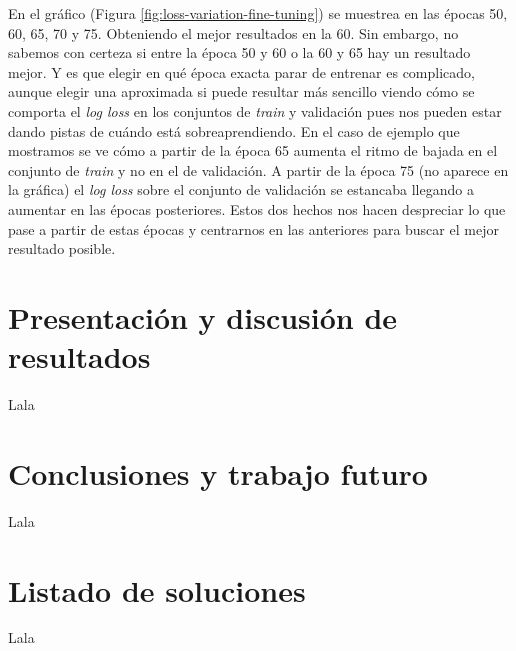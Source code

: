 En el gráfico (Figura \ref{fig:loss-variation-fine-tuning}) se muestrea en las épocas 50, 60, 65, 70 y 75. Obteniendo el mejor resultados en la 60. Sin embargo, no sabemos con certeza si entre la época 50 y 60 o la 60 y 65 hay un resultado mejor. Y es que elegir en qué época exacta parar de entrenar es complicado, aunque elegir una aproximada si puede resultar más sencillo viendo cómo se comporta el \textit{log loss} en los conjuntos de \textit{train} y validación pues nos pueden estar dando pistas de cuándo está sobreaprendiendo. En el caso de ejemplo que mostramos se ve cómo a partir de la época 65 aumenta el ritmo de bajada en el conjunto de \textit{train} y no en el de validación. A partir de la época 75 (no aparece en la gráfica) el \textit{log loss} sobre el conjunto de validación se estancaba llegando a aumentar en las épocas posteriores. Estos dos hechos nos hacen despreciar lo que pase a partir de estas épocas y centrarnos en las anteriores para buscar el mejor resultado posible.

\section{Presentación y discusión de resultados}

Lala

\section{Conclusiones y trabajo futuro}

Lala

\section{Listado de soluciones}

Lala


\newpage


